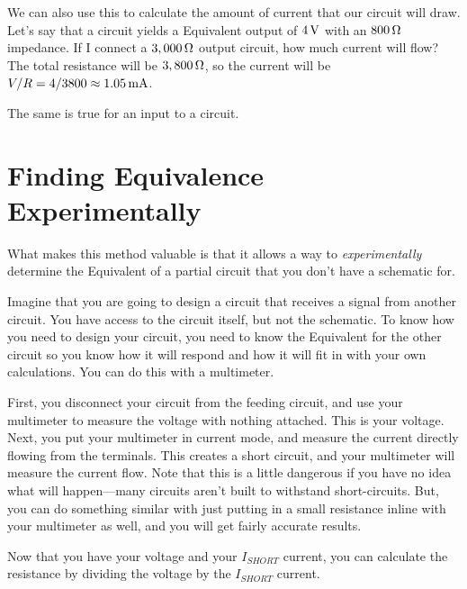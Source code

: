 We can also use this to calculate the amount of current that our circuit will draw.
Let's say that a circuit yields a \thev Equivalent output of $4\,\si{\volt}$ with an $800\,\si{\ohm}$ impedance.
If I connect a $3,000\,\si{\ohm}$ output circuit, how much current will flow?
The total resistance will be $3,800\,\si{\ohm}$, so the current will be $V / R = 4 / 3800 \approx 1.05\,\si{\milli\ampere}$.

The same is true for an input to a circuit.



\section{Finding \thev Equivalence Experimentally}


What makes this method valuable is that it allows a way to \emph{experimentally} determine the \thev Equivalent of a partial circuit that you don't have a schematic for.

Imagine that you are going to design a circuit that receives a signal from another circuit.
You have access to the circuit itself, but not the schematic.
To know how you need to design your circuit, you need to know the \thev Equivalent for the other circuit so you know how it will respond and how it will fit in with your own calculations.
You can do this with a multimeter.

First, you disconnect your circuit from the feeding circuit, and use your multimeter to measure the voltage with nothing attached.
This is your \thev voltage.
Next, you put your multimeter in current mode, and measure the current directly flowing from the terminals.
This creates a short circuit, and your multimeter will measure the current flow.
Note that this is a little dangerous if you have no idea what will happen---many circuits aren't built to withstand short-circuits.
But, you can do something similar with just putting in a small resistance inline with your multimeter as well, and you will get fairly accurate results.

Now that you have your \thev voltage and your $I_{SHORT}$ current, you can calculate the \thev resistance by dividing the \thev voltage by the $I_{SHORT}$ current.



\reviewsection

\applysection
